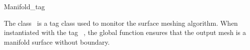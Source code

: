

\begin{ccRefClass}{Manifold_tag}  %


\ccDefinition
  
The class \ccRefName\ is a tag class used to monitor the
surface meshing algorithm. When instantiated with the tag
\ccRefName\ , the global function 
ensures that the output mesh  is a  manifold surface
without boundary.











\ccSeeAlso

\\
 \\





\end{ccRefClass}


